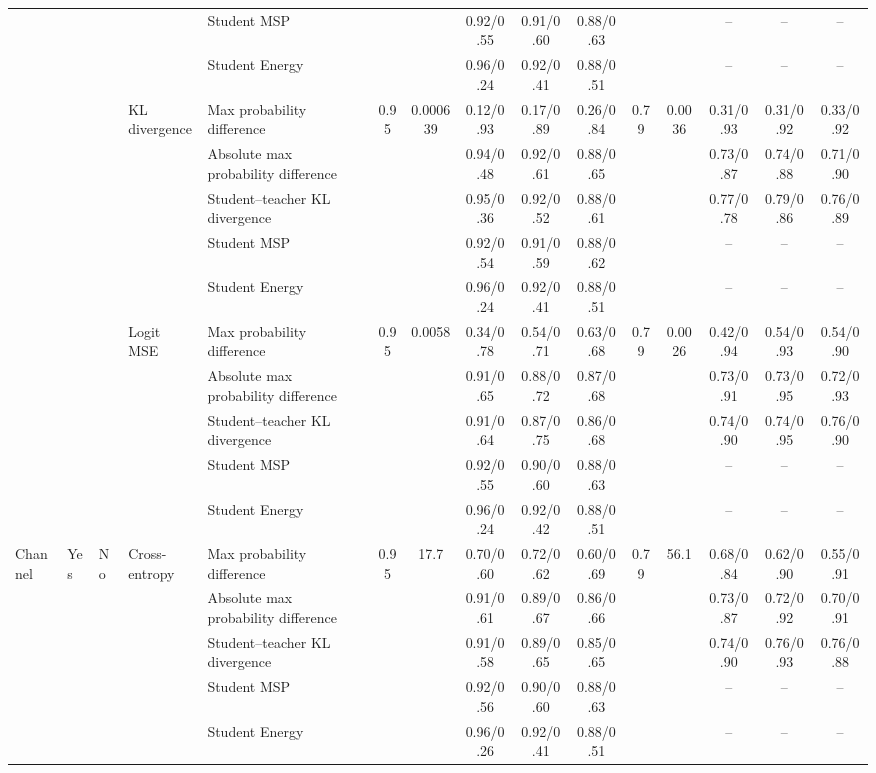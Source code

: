 \documentclass[border=2pt]{standalone}
\begin{document}
\begin{tabular}{lllllcccccccccc}
 &  &  &  & Student MSP &  &  & 0.92/0.55 & 0.91/0.60 & 0.88/0.63 &  &  & -- & -- & -- \\
 &  &  &  & Student Energy &  &  & 0.96/0.24 & 0.92/0.41 & 0.88/0.51 &  &  & -- & -- & -- \\
 &  &  & KL divergence & Max probability difference & 0.95 & 0.000639 & 0.12/0.93 & 0.17/0.89 & 0.26/0.84 & 0.79 & 0.0036 & 0.31/0.93 & 0.31/0.92 & 0.33/0.92 \\
 &  &  &  & Absolute max probability difference &  &  & 0.94/0.48 & 0.92/0.61 & 0.88/0.65 &  &  & 0.73/0.87 & 0.74/0.88 & 0.71/0.90 \\
 &  &  &  & Student--teacher KL divergence &  &  & 0.95/0.36 & 0.92/0.52 & 0.88/0.61 &  &  & 0.77/0.78 & 0.79/0.86 & 0.76/0.89 \\
 &  &  &  & Student MSP &  &  & 0.92/0.54 & 0.91/0.59 & 0.88/0.62 &  &  & -- & -- & -- \\
 &  &  &  & Student Energy &  &  & 0.96/0.24 & 0.92/0.41 & 0.88/0.51 &  &  & -- & -- & -- \\
 &  &  & Logit MSE & Max probability difference & 0.95 & 0.0058 & 0.34/0.78 & 0.54/0.71 & 0.63/0.68 & 0.79 & 0.0026 & 0.42/0.94 & 0.54/0.93 & 0.54/0.90 \\
 &  &  &  & Absolute max probability difference &  &  & 0.91/0.65 & 0.88/0.72 & 0.87/0.68 &  &  & 0.73/0.91 & 0.73/0.95 & 0.72/0.93 \\
 &  &  &  & Student--teacher KL divergence &  &  & 0.91/0.64 & 0.87/0.75 & 0.86/0.68 &  &  & 0.74/0.90 & 0.74/0.95 & 0.76/0.90 \\
 &  &  &  & Student MSP &  &  & 0.92/0.55 & 0.90/0.60 & 0.88/0.63 &  &  & -- & -- & -- \\
 &  &  &  & Student Energy &  &  & 0.96/0.24 & 0.92/0.42 & 0.88/0.51 &  &  & -- & -- & -- \\
\addlinespace
Channel & Yes & No & Cross-entropy & Max probability difference & 0.95 & 17.7 & 0.70/0.60 & 0.72/0.62 & 0.60/0.69 & 0.79 & 56.1 & 0.68/0.84 & 0.62/0.90 & 0.55/0.91 \\
 &  &  &  & Absolute max probability difference &  &  & 0.91/0.61 & 0.89/0.67 & 0.86/0.66 &  &  & 0.73/0.87 & 0.72/0.92 & 0.70/0.91 \\
 &  &  &  & Student--teacher KL divergence &  &  & 0.91/0.58 & 0.89/0.65 & 0.85/0.65 &  &  & 0.74/0.90 & 0.76/0.93 & 0.76/0.88 \\
 &  &  &  & Student MSP &  &  & 0.92/0.56 & 0.90/0.60 & 0.88/0.63 &  &  & -- & -- & -- \\
 &  &  &  & Student Energy &  &  & 0.96/0.26 & 0.92/0.41 & 0.88/0.51 &  &  & -- & -- & -- \\

\end{tabular}
\end{document}
